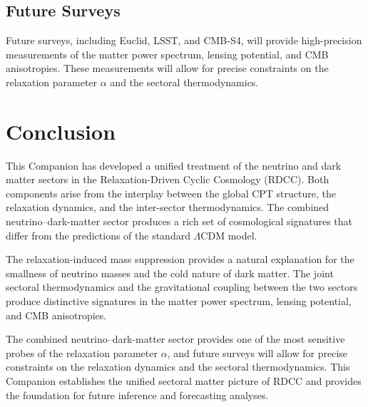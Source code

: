 \documentclass[11pt,a4paper]{article}
\newcommand{\alphaR}{\alpha}
\begin{document}
\subsection{Future Surveys}

Future surveys, including Euclid, LSST, and CMB-S4, will provide high-precision
measurements of the matter power spectrum, lensing potential, and CMB
anisotropies. These measurements will allow for precise constraints on the
relaxation parameter $\alphaR$ and the sectoral thermodynamics.




\section{Conclusion}

This Companion has developed a unified treatment of the neutrino and dark
matter sectors in the Relaxation-Driven Cyclic Cosmology (RDCC). Both
components arise from the interplay between the global CPT structure, the
relaxation dynamics, and the inter-sector thermodynamics. The combined
neutrino–dark-matter sector produces a rich set of cosmological signatures that
differ from the predictions of the standard $\Lambda$CDM model.

The relaxation-induced mass suppression provides a natural explanation for the
smallness of neutrino masses and the cold nature of dark matter. The joint
sectoral thermodynamics and the gravitational coupling between the two sectors
produce distinctive signatures in the matter power spectrum, lensing potential,
and CMB anisotropies.

The combined neutrino–dark-matter sector provides one of the most sensitive
probes of the relaxation parameter $\alphaR$, and future surveys will allow for
precise constraints on the relaxation dynamics and the sectoral thermodynamics.
This Companion establishes the unified sectoral matter picture of RDCC and
provides the foundation for future inference and forecasting analyses.



\end{document}
